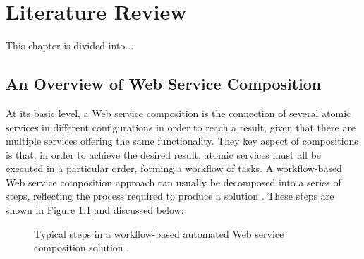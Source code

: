 \chapter{Literature Review}\label{C:review}

This chapter is divided into...

\section{An Overview of Web Service Composition}

At its basic level, a Web service composition is the connection of several atomic services in different configurations in order to reach a result, given that there are multiple services offering the same functionality. They key aspect of compositions is that, in order to achieve the desired result, atomic services must all be executed in a particular order, forming a workflow of tasks. A workflow-based Web service composition approach can usually be decomposed into a series of steps, reflecting the process required to produce a solution \cite{moghaddam2014service}. These steps are shown in Figure \ref{fig:steps} and discussed below:

\begin{figure}
\centerline{
}
\caption{Typical steps in a workflow-based automated Web service composition solution \cite{moghaddam2014service}.}
\label{fig:steps}
\end{figure}

